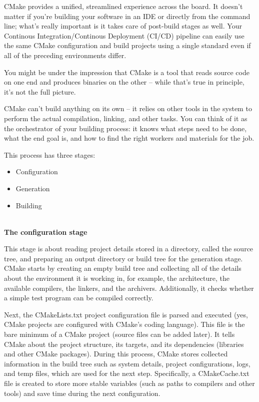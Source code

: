 CMake provides a unified, streamlined experience across the board. It doesn't matter if you're building your software in an IDE or directly from the command line; what's really important is it takes care of post-build stages as well. Your Continous Integration/Continous Deployment (CI/CD) pipeline can easily use the same CMake configuration and build projects using a single standard even if all of the preceding environments differ.


You might be under the impression that CMake is a tool that reads source code on one end and produces binaries on the other – while that's true in principle, it's not the full picture.

CMake can't build anything on its own – it relies on other tools in the system to perform the actual compilation, linking, and other tasks. You can think of it as the orchestrator of your building process: it knows what steps need to be done, what the end goal is, and how to find the right workers and materials for the job.

This process has three stages:

\begin{itemize}
\item 
Configuration

\item 
Generation

\item 
Building
\end{itemize}

\hspace*{\fill} \\ %
\noindent
\textbf{The configuration stage}

This stage is about reading project details stored in a directory, called the source tree, and preparing an output directory or build tree for the generation stage. CMake starts by creating an empty build tree and collecting all of the details about the environment it is working in, for example, the architecture, the available compilers, the linkers, and the archivers. Additionally, it checks whether a simple test program can be compiled correctly.

Next, the CMakeLists.txt project configuration file is parsed and executed (yes, CMake projects are configured with CMake's coding language). This file is the bare minimum of a CMake project (source files can be added later). It tells CMake about the project structure, its targets, and its dependencies (libraries and other CMake packages). During this process, CMake stores collected information in the build tree such as system details, project configurations, logs, and temp files, which are used for the next step. Specifically, a CMakeCache.txt file is created to store more stable variables (such as paths to compilers and other tools) and save time during the next configuration.

